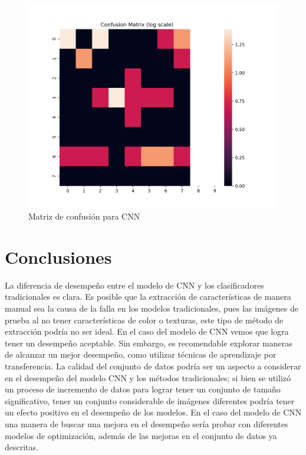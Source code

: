 \documentclass[transmag]{IEEEtran}
\begin{document}
\begin{figure}[H]
	\centering
	\includegraphics[width=0.8\linewidth]{finalmat}
	\caption{Matriz de confusión para CNN}
	\label{fig:conf_cnn}
\end{figure}

\section{Conclusiones}

La diferencia de desempeño entre el modelo de CNN y los clasificadores tradicionales es clara. Es posible que la extracción de características de manera manual sea la causa de la falla en los modelos tradicionales, pues las imágenes de prueba al no tener características de color o texturas, este tipo de método de extracción podría no ser ideal.  En el caso del modelo de CNN vemos que logra tener un desempeño aceptable.  Sin embargo, es recomendable explorar maneras de alcanzar un mejor desempeño, como utilizar técnicas de aprendizaje por transferencia. La calidad del conjunto de datos podría ser un aspecto a considerar en el desempeño del modelo CNN y los métodos tradicionales; si bien se utilizó un proceso de incremento de datos para lograr tener un conjunto de tamaño significativo, tener un conjunto considerable de imágenes diferentes podría tener un efecto positivo en el desempeño de los modelos. En el caso del modelo de CNN una manera de buscar una mejora en el desempeño sería probar con diferentes modelos de optimización, además de las mejoras en el conjunto de datos ya descritas. 



\end{document}
